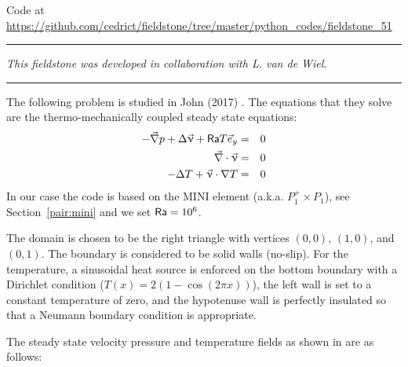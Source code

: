 

\begin{center}
Code at \url{https://github.com/cedrict/fieldstone/tree/master/python_codes/fieldstone_51}
\end{center}

\par\noindent\rule{\textwidth}{0.4pt}

{\sl This fieldstone was developed in collaboration with L. van de Wiel}. 

\par\noindent\rule{\textwidth}{0.4pt}


The following problem is studied in John \etal (2017) \cite{jolm17}. 
The equations that they solve are the thermo-mechanically coupled steady state equations:
\begin{eqnarray}
-\vec{\nabla}p + \Delta \vec{\upnu} + {\mathsf{Ra}} T \vec{e}_y &=& 0\\
\vec\nabla\cdot\vec\upnu &=& 0 \\
-\Delta T + \vec\upnu\cdot\nabla T &=& 0
\end{eqnarray}
In our case the code is based on the MINI element (a.k.a. $P_1^+ \times P_1$), see Section~\ref{pair:mini}
and we set ${\mathsf{Ra}}=10^6$.

The domain is chosen to be the right triangle
with vertices $(0,0)$, $(1,0)$, and $(0,1)$. 
The boundary is considered to be solid walls (no-slip).
For the temperature, a sinusoidal heat source is enforced on the bottom
boundary with a Dirichlet condition ($T(x)=2(1-\cos (2\pi x))$), 
the left wall is set to a constant temperature
of zero, and the hypotenuse wall is perfectly insulated so that a Neumann 
boundary condition is appropriate.

The steady state velocity pressure and temperature fields as shown in 
\cite{jolm17} are as follows:

